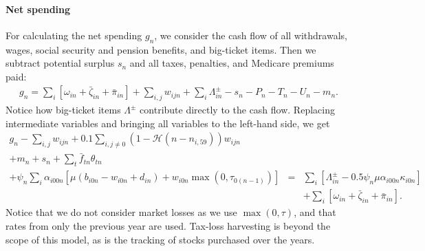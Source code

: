 \documentclass{report}[fleqn,12pt]
\begin{document}
\paragraph*{Net spending}
	For calculating the net spending $g_n$, we consider the cash flow of all withdrawals,
	wages, social security and pension benefits, and big-ticket items. 
	Then we subtract potential surplus $s_{n}$ and all taxes, penalties, and Medicare premiums paid:
	\begin{eqnarray}
		g_n = \sum_i [\omega_{in} + \bar{\zeta}_{in} + \bar{\pi}_{in} ] 
		+ \sum_{i,j} w_{ijn} + \sum_i \Lambda^\pm_{in} - s_{n}
		- P_n - T_n - U_n - m_n.
	\end{eqnarray}
	Notice how big-ticket items $\Lambda^\pm$ contribute directly to the cash flow.
	Replacing intermediate variables and bringing all variables to the left-hand side, we get
	\begin{eqnarray}
		\label{Eq:C4}
		g_n - \sum_{i,j} w_{ijn} + 0.1 \sum_{i,j\neq0} (1-\mathcal{H}(n - n_{i, 59})) w_{ijn}\nonumber\\
                + m_n + s_n + \sum_t \bar{f}_{tn} \theta_{t n} &&\nonumber \\
		+ \psi_n\sum_i \alpha_{i00n} \left[\mu(b_{i0n} - w_{i0n} + d_{in})
		+ w_{i0n}\max(0, \tau_{0(n-1)})\right] 
		&=& \sum_i [\Lambda^\pm_{in} - 0.5\psi_n\mu\alpha_{i00n}\kappa_{i0n}] \nonumber\\
                && + \sum_i [\omega_{in} + \bar{\zeta}_{in} + \bar{\pi}_{in} ].
	\end{eqnarray}
	Notice that we do not consider market losses as we use $\max(0, \tau)$, and that
	rates from only the previous year are used. Tax-loss
	harvesting is beyond the scope of this model, as is the tracking of stocks
	purchased over the years.
\end{document}
